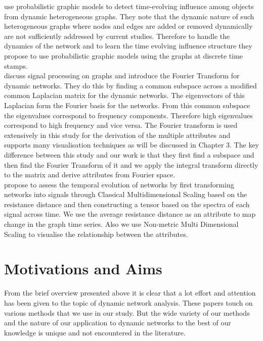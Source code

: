 \citeauthor{Hu2015}\cite{Hu2015} use probabilistic graphic models to detect time-evolving influence among objects from dynamic heterogeneous graphs. They note that the dynamic nature of such heterogeneous graphs where nodes and edges are added or removed dynamically are not sufficiently addressed by current studies. Therefore to handle the dynamics of the network and to learn the time evolving influence structure they propose to use probabilistic graphic models using the graphs at discrete time stamps. \\

\citeauthor{Mahyari2015}\cite{Mahyari2015} discuss signal processing on graphs and introduce the Fourier Transform for dynamic networks. They do this by finding a common subspace across a modified common Laplacian matrix for the dynamic networks. The eigenvectors of this Laplacian form the Fourier basis for the networks. From this common subspace the eigenvalues correspond to frequency components. Therefore high eigenvalues correspond to high frequency and vice versa. The Fourier transform is used extensively in this study for the derivation of the multiple attributes and supports many visualisation techniques as will be discussed in Chapter 3.  The key difference between this study and our work is that they first find a subspace and then find the Fourier Transform of it and we apply the integral transform directly to the matrix and derive attributes from Fourier space.\\

\citeauthor{Lansing2016}\cite{Lansing2016} propose to assess the temporal evolution of networks by first transforming networks into signals through Classical Multidimensional  Scaling  based  on  the  resistance  distance  and then constructing  a  tensor  based  on  the  spectra  of  each  signal  across time. We use the average resistance distance as an attribute to map change in the graph time series. Also we use Non-metric Multi Dimensional Scaling to visualise the relationship between the attributes.

\section{Motivations and Aims}

From the brief overview presented above it is clear that a lot effort and attention has been given to the topic of dynamic network analysis. These papers touch on various methods that we use in our study. But the wide variety of our methods and the nature of our application to dynamic networks to the best of our knowledge is unique and not encountered in the literature. \\

